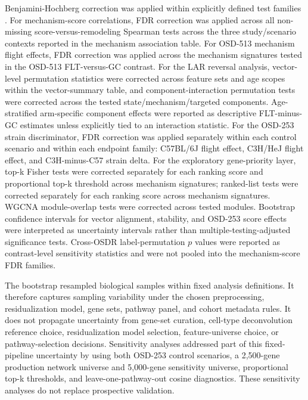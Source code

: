\documentclass[11pt]{article}
\begin{document}
Benjamini-Hochberg correction was applied within explicitly defined test families \citep{benjamini1995controlling}. For mechanism-score correlations, FDR correction was applied across all non-missing score-versus-remodeling Spearman tests across the three study/scenario contexts reported in the mechanism association table. For OSD-513 mechanism flight effects, FDR correction was applied across the mechanism signatures tested in the OSD-513 FLT-versus-GC contrast. For the LAR reversal analysis, vector-level permutation statistics were corrected across feature sets and age scopes within the vector-summary table, and component-interaction permutation tests were corrected across the tested state/mechanism/targeted components. Age-stratified arm-specific component effects were reported as descriptive FLT-minus-GC estimates unless explicitly tied to an interaction statistic. For the OSD-253 strain discriminator, FDR correction was applied separately within each control scenario and within each endpoint family: C57BL/6J flight effect, C3H/HeJ flight effect, and C3H-minus-C57 strain delta. For the exploratory gene-priority layer, top-k Fisher tests were corrected separately for each ranking score and proportional top-k threshold across mechanism signatures; ranked-list tests were corrected separately for each ranking score across mechanism signatures. WGCNA module-overlap tests were corrected across tested modules. Bootstrap confidence intervals for vector alignment, stability, and OSD-253 score effects were interpreted as uncertainty intervals rather than multiple-testing-adjusted significance tests. Cross-OSDR label-permutation $p$ values were reported as contrast-level sensitivity statistics and were not pooled into the mechanism-score FDR families.

The bootstrap resampled biological samples within fixed analysis definitions. It therefore captures sampling variability under the chosen preprocessing, residualization model, gene sets, pathway panel, and cohort metadata rules. It does not propagate uncertainty from gene-set curation, cell-type deconvolution reference choice, residualization model selection, feature-universe choice, or pathway-selection decisions. Sensitivity analyses addressed part of this fixed-pipeline uncertainty by using both OSD-253 control scenarios, a 2,500-gene production network universe and 5,000-gene sensitivity universe, proportional top-k thresholds, and leave-one-pathway-out cosine diagnostics. These sensitivity analyses do not replace prospective validation.
\end{document}
